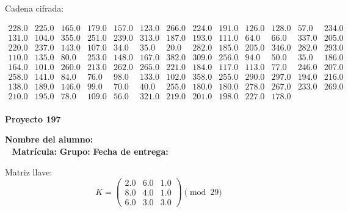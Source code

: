 \documentclass[12pt]{article}
\begin{document}
Cadena cifrada:
\begin{center}
$\begin{array}{lllllllllllll}
228.0 & 225.0 & 165.0 & 179.0 & 157.0 & 123.0 & 266.0 & 224.0 & 191.0 & 126.0 & 128.0 & 57.0 & 234.0\\
131.0 & 104.0 & 355.0 & 251.0 & 239.0 & 313.0 & 187.0 & 193.0 & 111.0 & 64.0 & 66.0 & 337.0 & 205.0\\
220.0 & 237.0 & 143.0 & 107.0 & 34.0 & 35.0 & 20.0 & 282.0 & 185.0 & 205.0 & 346.0 & 282.0 & 293.0\\
110.0 & 135.0 & 80.0 & 253.0 & 148.0 & 167.0 & 382.0 & 309.0 & 256.0 & 94.0 & 50.0 & 35.0 & 186.0\\
164.0 & 101.0 & 260.0 & 213.0 & 262.0 & 265.0 & 221.0 & 184.0 & 117.0 & 113.0 & 77.0 & 246.0 & 207.0\\
258.0 & 141.0 & 84.0 & 76.0 & 98.0 & 133.0 & 102.0 & 358.0 & 255.0 & 290.0 & 297.0 & 194.0 & 216.0\\
138.0 & 189.0 & 146.0 & 99.0 & 70.0 & 40.0 & 255.0 & 180.0 & 180.0 & 278.0 & 267.0 & 233.0 & 269.0\\
210.0 & 195.0 & 78.0 & 109.0 & 56.0 & 321.0 & 219.0 & 201.0 & 198.0 & 227.0 & 178.0\\
\end{array}$
\end{center}

\newpage


\textbf{Proyecto 197}

\textbf{Nombre del alumno:} \underline{\hspace{13cm}}\\\
\vspace{1cm}
\textbf{Matrícula:} \underline{\hspace{4cm}} \hspace{1cm}
\textbf{Grupo:} \underline{\hspace{2cm}}
\textbf{Fecha de entrega:} \underline{\hspace{2cm}}

\medskip

Matriz llave:
\[
K = \begin{pmatrix}
2.0 & 6.0 & 1.0\\
8.0 & 4.0 & 1.0\\
6.0 & 3.0 & 3.0
\end{pmatrix} \pmod{29}
\]
\end{document}
